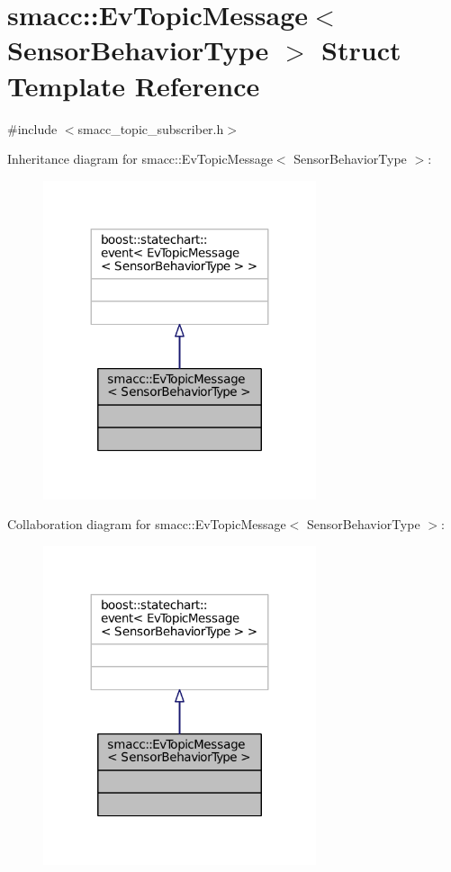 \hypertarget{structsmacc_1_1EvTopicMessage}{}\section{smacc\+:\+:Ev\+Topic\+Message$<$ Sensor\+Behavior\+Type $>$ Struct Template Reference}
\label{structsmacc_1_1EvTopicMessage}


{\ttfamily \#include $<$smacc\+\_\+topic\+\_\+subscriber.\+h$>$}



Inheritance diagram for smacc\+:\+:Ev\+Topic\+Message$<$ Sensor\+Behavior\+Type $>$\+:
\nopagebreak
\begin{figure}[H]
\begin{center}
\leavevmode
\includegraphics[width=227pt]{structsmacc_1_1EvTopicMessage__inherit__graph}
\end{center}
\end{figure}


Collaboration diagram for smacc\+:\+:Ev\+Topic\+Message$<$ Sensor\+Behavior\+Type $>$\+:
\nopagebreak
\begin{figure}[H]
\begin{center}
\leavevmode
\includegraphics[width=227pt]{structsmacc_1_1EvTopicMessage__coll__graph}
\end{center}
\end{figure}



